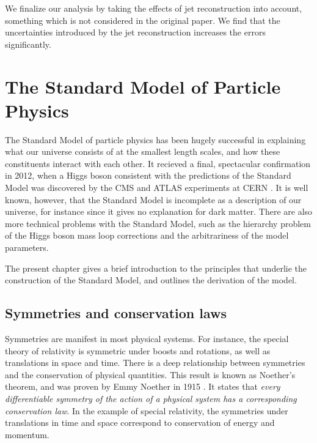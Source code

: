 \documentclass[twoside,english]{uiofysmaster}
\begin{document}
We finalize our analysis by taking the effects of jet reconstruction into account, something which is not considered in the original paper. We find that the uncertainties introduced by the jet reconstruction increases the errors significantly. 


% 
\chapter{The Standard Model of Particle Physics}%
\label{ch:SM_intro}
The Standard Model of particle physics has been hugely successful in explaining what our universe consists of at the smallest length scales, and how these constituents interact with each other. It recieved a final, spectacular confirmation in 2012, when a Higgs boson consistent with the predictions of the Standard Model was discovered by the CMS and ATLAS experiments at CERN \cite{Aad:2012tfa, Chatrchyan:2012ufa}. It is well known, however, that the Standard Model is incomplete as a description of our universe, for instance since it gives no explanation for dark matter. There are also more technical problems with the Standard Model, such as the hierarchy problem of the Higgs boson mass loop corrections and the arbitrariness of the model parameters.

The present chapter gives a brief introduction to the principles that underlie the construction of the Standard Model, and outlines the derivation of the model. 

\section{Symmetries and conservation laws}
Symmetries are manifest in most physical systems. For instance, the special theory of relativity is symmetric under boosts and rotations, as well as translations in space and time. There is a deep relationship between symmetries and the conservation of physical quantities. This result is known as Noether's theorem, and was proven by Emmy Noether in 1915 \cite{Noether:1918zz}. It states that {\it every differentiable symmetry of the action of a physical system has a corresponding conservation law}. In the example of special relativity, the symmetries under translations in time and space correspond to conservation of energy and momentum.%
\end{document}
